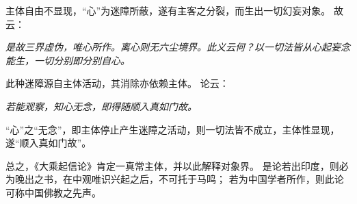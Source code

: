 \documentclass[11pt]{article}
\begin{document}
主体自由不显现，“心”为迷障所蔽，遂有主客之分裂，而生出一切幻妄对象。
故云：

\textit{是故三界虚伪，唯心所作。离心则无六尘境界。此义云何？以一切法皆从心起妄念能生，一切分别即分别自心。}

此种迷障源自主体活动，其消除亦依赖主体。
论云：

\textit{若能观察，知心无念，即得随顺入真如门故。}

“心”之“无念”，即主体停止产生迷障之活动，则一切法皆不成立，主体性显现，遂“顺入真如门故”。

\newline

总之，《大乘起信论》肯定一真常主体，并以此解释对象界。
是论若出印度，则必为晚出之书，在中观唯识兴起之后，不可托于马鸣；
若为中国学者所作，则此论可称中国佛教之先声。
\end{document}
